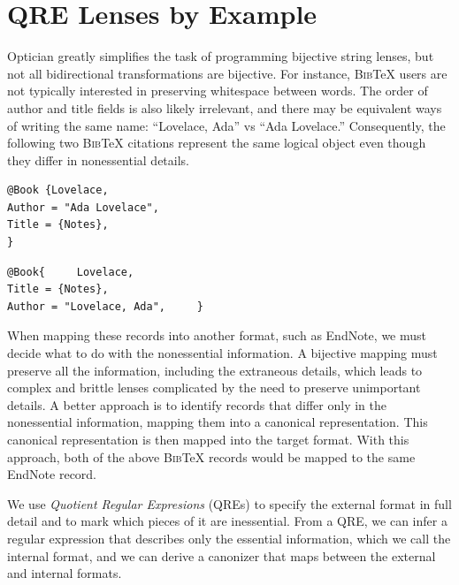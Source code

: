 \documentclass[acmsmall,review,anonymous]{acmart}
\newcommand{\bibtex}{\textsc{Bib}\TeX{}}
\begin{document}
\section{QRE Lenses by Example}
\label{sec:example}

Optician greatly simplifies the task of programming bijective
string lenses, but not all bidirectional transformations are
bijective.  For instance, \bibtex{} users are not typically interested
in preserving whitespace between words.  The order of author and title
fields is also likely irrelevant, and there may be equivalent ways of
writing the same name: ``Lovelace, Ada'' vs ``Ada Lovelace.''
Consequently, the following two \bibtex{} citations represent the same
logical object even though they differ in nonessential details.

\begin{center}
  \begin{minipage}{2.2in}
    \centering
\begin{lstlisting}
@Book {Lovelace,
Author = "Ada Lovelace",
Title = {Notes},
}
\end{lstlisting}
  \end{minipage}
  \begin{minipage}{2in}
    \centering
\begin{lstlisting}
@Book{     Lovelace,
Title = {Notes},
Author = "Lovelace, Ada",     }
\end{lstlisting}
  \end{minipage}
\end{center}

When mapping these records into another format, such as EndNote, we
must decide what to do with the nonessential information.  A bijective
mapping must preserve all the information, including the extraneous
details, which leads to complex and brittle lenses complicated by the
need to preserve unimportant details.  
A better approach is to identify records that differ only in the
nonessential information, mapping them into a canonical representation.
This canonical representation is then mapped into the target format.
With this approach, both of the above \bibtex{} records would be
mapped to the same EndNote record.

We use {\em Quotient Regular Expresions} (QREs) to specify the
external format in full detail and to mark which pieces of it are
inessential.  From a QRE, we can infer a regular expression that
describes only the essential information, which we call the internal
format, and we can derive a canonizer that maps between the external
and internal formats.
\end{document}
